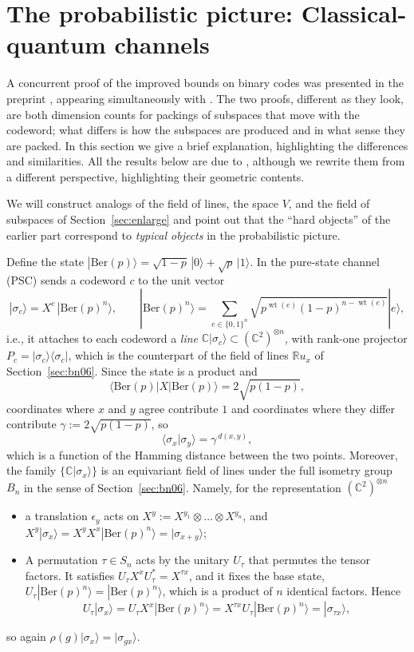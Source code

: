 \documentclass[11pt]{amsart}
\theoremstyle{plain}
\theoremstyle{remark}
\newcommand{\R}{\mathbb{R}}
\newcommand{\C}{\mathbb{C}}
\newcommand{\la}{\langle}
\newcommand{\ra}{\rangle}
\newcommand{\Stab}{\operatorname{Stab}}
\newcommand{\wt}{\operatorname{wt}}
\begin{document}
\section{The probabilistic picture: Classical-quantum channels}\label{sec: quantum}
A concurrent proof of the improved bounds on binary codes  was presented in the preprint \cite{AG26}, appearing simultaneously with \cite{OAI26}. The two proofs, different as they look, are both dimension counts for packings of subspaces that move with the codeword; what differs is how the subspaces are produced and in what sense they are packed. In this section we give a brief explanation, highlighting the differences and similarities. %
All the results below are due to \cite{AG26}, although we rewrite them from a different perspective, highlighting their geometric contents.

We will construct analogs of the field of lines, the space $V$, and the field of subspaces
of Section~\ref{sec:enlarge} and point out that the ``hard objects'' of the earlier part correspond to {\em typical objects} in the probabilistic picture. 

Define the state $|\mathrm{Ber}(p)\ra=\sqrt{1-p}\,|0\ra+\sqrt p\,|1\ra$. In \cite{AG26} the pure-state channel (PSC) sends a codeword $c$ to the unit vector
    \[
 |\sigma_c\ra=X^{c}\,|\mathrm{Ber}(p)^{n}\ra ,
 \qquad
  |\mathrm{Ber}(p)^n\ra=\sum_{e\in\{0,1\}^n}\sqrt{p^{\wt(e)}(1-p)^{n-\wt(e)}} |e\ra,
   \]
i.e., it attaches to each codeword a \emph{line} 
$\C|\sigma_c\ra\subset (\C^{2})^{\otimes n}$, with rank-one projector
$P_c=|\sigma_c\ra\la\sigma_c|$, which is the counterpart of the field of lines
$\R u_x$ of Section~\ref{sec:bn06}. Since the state is a product and
   $$
   \la\mathrm{Ber}(p)|X|\mathrm{Ber}(p)\ra=2\sqrt{p(1-p)},
   $$
   coordinates where
$x$ and $y$ agree contribute $1$ and coordinates where they differ
contribute $\gamma:=2\sqrt{p(1-p)}$, so
\[
 \la\sigma_x|\sigma_y\ra=\gamma^{\,d(x,y)} ,
\]
which is a function of the Hamming distance between the two points. Moreover, the family $\{\C|\sigma_x\ra\}$ is an equivariant field of lines under the full isometry group $B_n$ in the sense of Section~\ref{sec:bn06}. Namely, for the representation $(\C^2)^{\otimes n}$
\begin{itemize}
    \item a translation $\epsilon_y$ acts on $X^y:=X^{y_1}\otimes\dots\otimes X^{y_n}$, and
    $X^y|\sigma_x\ra=X^y X^x|\mathrm{Ber}(p)^{n}\ra=|\sigma_{x+y}\ra$;
    \item A permutation $\tau\in S_n$ acts by the unitary $U_\tau$ that permutes the
tensor factors. It satisfies $U_\tau X^{x}U_\tau^{*}=X^{\tau x}$, and it fixes
the base state, $U_\tau|\mathrm{Ber}(p)^n\ra=|\mathrm{Ber}(p)^n\ra$, which is 
a product of $n$ identical factors. Hence
\[
 U_\tau|\sigma_x\ra=U_\tau X^{x}|\mathrm{Ber}(p)^n\ra
 =X^{\tau x}U_\tau|\mathrm{Ber}(p)^n\ra=|\sigma_{\tau x}\ra,
\]
\end{itemize}
so again $\rho(g)|\sigma_x\ra=|\sigma_{gx}\ra$.
\end{document}
